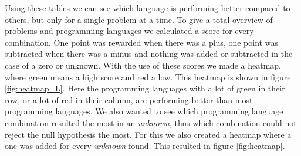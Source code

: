 \begin{table}[h]
\centering
{}
\caption{The comparison of the different languages for the Nbody problem on \textit{node28}. A \textit{+} means that the language on the row has a lower energy consumption then the language on the column, the opposite for \textit{-}, and the \textit{Unknown} means that we could not reject the null hypothesis.}
\label{tab:lang-example}
\end{table}

Using these tables we can see which language is performing better compared to others, but only for a single problem at a time. To give a total overview of problems and programming languages we calculated a score for every combination. One point was rewarded when there was a plus, one point was subtracted when there was a minus and nothing was added or subtracted in the case of a zero or unknown. With the use of these scores we made a heatmap, where green means a high score and red a low. This heatmap is shown in figure \ref{fig:heatmap_L}. Here the programming languages with a lot of green in their row, or a lot of red in their column, are performing better than most programming languages. We also wanted to see which programming language combination resulted the most in an \textit{unknown}, thus which combination could not reject the null hypothesis the most. For this we also created a heatmap where a one was added for every \textit{unknown} found. This resulted in figure \ref{fig:heatmap}.


